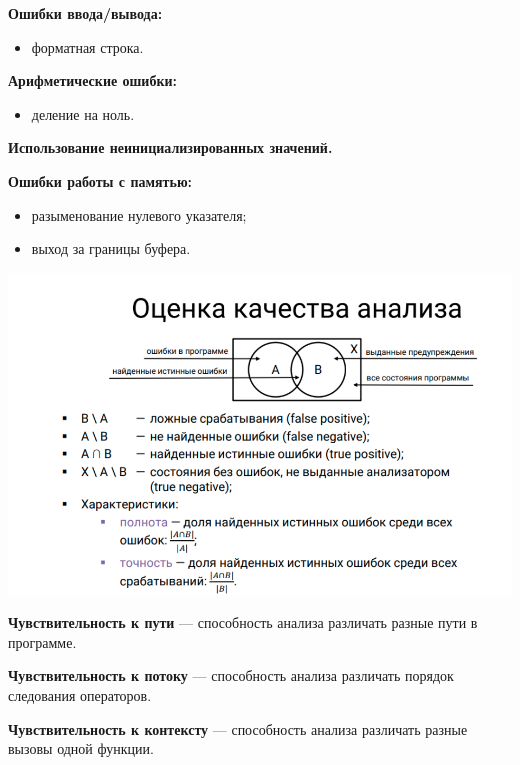 \textbf{Ошибки ввода/вывода:}
\begin{itemize}
    \item форматная строка.
\end{itemize}

\textbf{Арифметические ошибки:}
\begin{itemize}
    \item деление на ноль.
\end{itemize}

\textbf{Использование неинициализированных значений.}

\textbf{Ошибки работы с памятью:}
\begin{itemize}
    \item разыменование нулевого указателя;
    \item выход за границы буфера.
\end{itemize}

\includegraphics[width=\linewidth]{pics/quality_check.png}

\textbf{Чувствительность к пути} — способность анализа различать разные пути в программе.

\textbf{Чувствительность к потоку} — способность анализа различать порядок следования операторов.

\textbf{Чувствительность к контексту} — способность анализа различать разные вызовы одной функции.

